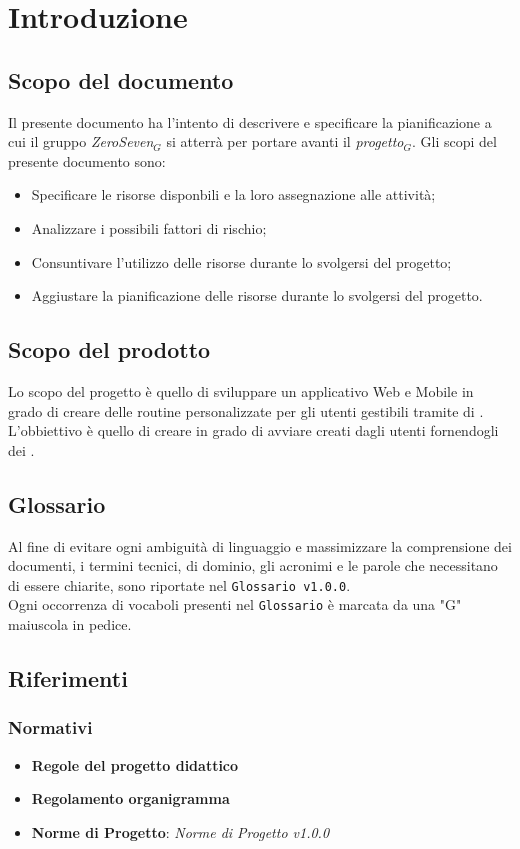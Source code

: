 \chapter{Introduzione}
\section{Scopo del documento}
Il presente documento ha l'intento di descrivere e specificare la pianificazione a cui il gruppo \textit{ZeroSeven$_{G}$} si atterrà per portare avanti il \textit{progetto$_{G}$}.
Gli scopi del presente documento sono:
\begin{itemize}
	\item Specificare le risorse disponbili e la loro assegnazione alle attività;
	\item Analizzare i possibili fattori di rischio;
	\item Consuntivare l'utilizzo delle risorse durante lo svolgersi del progetto;
	\item Aggiustare la pianificazione delle risorse durante lo svolgersi del progetto.
\end{itemize}
\section{Scopo del prodotto}
Lo scopo del progetto è quello di sviluppare un applicativo Web e Mobile in grado di creare delle routine personalizzate per gli utenti gestibili tramite  di . L'obbiettivo è quello di creare  in grado di avviare  creati dagli utenti fornendogli dei .
\section{Glossario}
Al fine di evitare ogni ambiguità di linguaggio e massimizzare la comprensione dei documenti, i termini tecnici, di dominio, gli acronimi e le parole che necessitano di essere chiarite, sono riportate nel \texttt{Glossario v1.0.0}.\\
Ogni occorrenza di vocaboli presenti nel \texttt{Glossario} è marcata da una "G" maiuscola in pedice.
\section{Riferimenti}
\subsection{Normativi}
\begin{itemize}
	\item \textbf{Regole del progetto didattico}
	\item  \textbf{Regolamento organigramma}
	\item  \textbf{Norme di Progetto}: \textit{Norme di Progetto v1.0.0}
\end{itemize}
